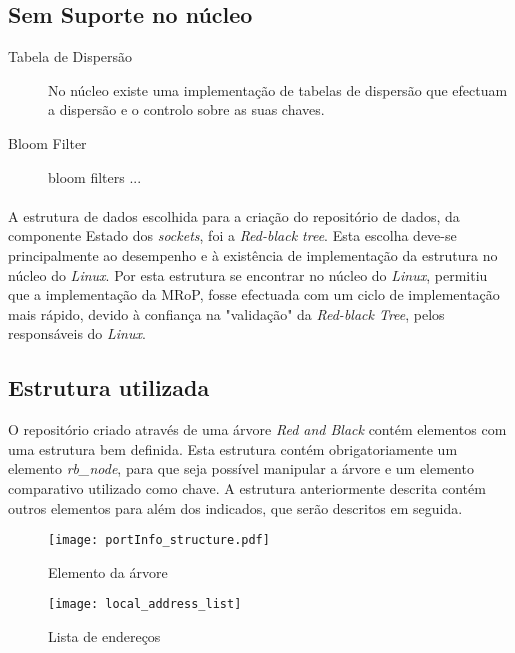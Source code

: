 \subsection{Sem Suporte no núcleo}

\begin{description}
\item[Tabela de Dispersão]
No núcleo existe uma implementação de tabelas de dispersão que efectuam a dispersão e o controlo sobre as suas chaves.


\item[Bloom Filter]
bloom filters ...

\end{description}
\paragraph*{}
A estrutura de dados escolhida para a criação do repositório de dados, da componente Estado dos \textit{sockets}, foi a \textit{Red-black tree}.
 Esta escolha deve-se principalmente ao desempenho e à existência de implementação da estrutura no núcleo do \textit{Linux}.
 Por esta estrutura se encontrar no núcleo do \textit{Linux}, permitiu que a implementação da MRoP, fosse efectuada com um ciclo de implementação mais rápido, devido à confiança na "validação" da \textit{Red-black Tree}, pelos responsáveis do \textit{Linux}.
 
\subsection{Estrutura utilizada}
\label{sub:repo_structure}

O repositório criado através de uma árvore \textit{Red and Black} contém elementos com uma estrutura bem definida.
Esta estrutura contém obrigatoriamente um elemento \textit{rb\_node}, para que seja possível manipular a árvore e um elemento comparativo utilizado como chave.
A estrutura anteriormente descrita contém outros elementos para além dos indicados, que serão descritos em seguida.

\begin{figure}[ht]
\begin{minipage}[b]{0.5\linewidth}
\centering
\texttt{[image: portInfo\_structure.pdf]}
\caption{Elemento da árvore}
\label{fig:portInfo}
\end{minipage}
\hspace{0.5cm}
\begin{minipage}[b]{0.5\linewidth}
\centering
\texttt{[image: local\_address\_list]}
\caption{Lista de endereços}
\label{fig:local_address_list}
\end{minipage}
\end{figure}

